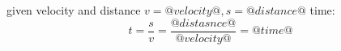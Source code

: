 \documentclass{article}
\begin{document}
	given velocity and distance $v=@velocity@, s=@distance@$
	time:
	\begin{equation}
		t = \dfrac{s}{v} = \dfrac{@distasnce@}{@velocity@} = @time@
	\end{equation}
\end{document}
